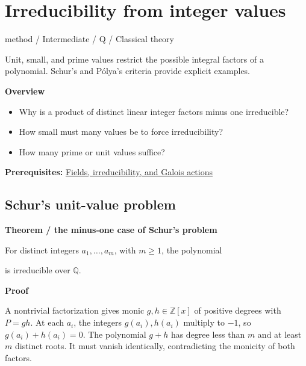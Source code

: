 \documentclass[11pt,a4paper,oneside,openany]{book}
\newcommand{\atlasdisplay}[1]{\par\begingroup\centering\vspace{3pt}\noindent\adjustbox{max width=\linewidth}{\(\displaystyle #1\)}\par\vspace{5pt}\endgroup}
\begin{document}
\chapter{Irreducibility from integer values}\label{article:integer-values}\hypertarget{article:integer-values}{}\color{black}
{\sffamily\small\color{atlasgold}method / Intermediate / Q / Classical theory}\par\medskip
Unit, small, and prime values restrict the possible integral factors of a polynomial. Schur's and Pólya's criteria provide explicit examples.\par\medskip
\textbf{Overview}\begin{itemize}
\item Why is a product of distinct linear integer factors minus one irreducible?
\item How small must many values be to force irreducibility?
\item How many prime or unit values suffice?
\end{itemize}
{\small\textbf{Prerequisites:} \hyperlink{article:foundations}{Fields, irreducibility, and Galois actions}}\par
{}\section{Schur's unit-value problem}

\begin{atlasblock}[standard]
\textbf{\sffamily Theorem  /  the minus-one case of Schur's problem}\par\smallskip
\color{black} For distinct integers \(a_1,\ldots,a_m\), with \(m\ge1\), the polynomial\par

\atlasdisplay{P(x)=\prod_{i=1}^{m}(x-a_i)-1}
\color{black} is irreducible over \(\mathbb Q\).\par
\end{atlasblock}\color{black}


\begin{atlasblock}[standard]
\textbf{\sffamily Proof}\par\smallskip
\color{black} A nontrivial factorization gives monic \(g,h\in\mathbb Z[x]\) of positive degrees with \(P=gh\). At each \(a_i\), the integers \(g(a_i),h(a_i)\) multiply to \(-1\), so \(g(a_i)+h(a_i)=0\). The polynomial \(g+h\) has degree less than \(m\) and at least \(m\) distinct roots. It must vanish identically, contradicting the monicity of both factors.\par
\end{atlasblock}\color{black}
\end{document}
